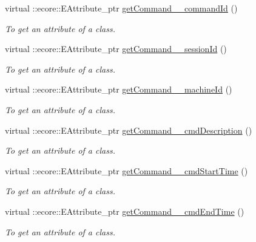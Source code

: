 \begin{DoxyCompactItemize}
virtual ::ecore::EAttribute\_\-ptr \hyperlink{classUMS__Data_1_1UMS__DataPackage_ac206a61c6f0c63a1b8c32607bb4fa14e}{getCommand\_\-\_\-commandId} ()
\begin{DoxyCompactList}\small\item\em To get an attribute of a class. \item\end{DoxyCompactList}\item 
virtual ::ecore::EAttribute\_\-ptr \hyperlink{classUMS__Data_1_1UMS__DataPackage_ae5ba979e040471ef1aff9c3911358c60}{getCommand\_\-\_\-sessionId} ()
\begin{DoxyCompactList}\small\item\em To get an attribute of a class. \item\end{DoxyCompactList}\item 
virtual ::ecore::EAttribute\_\-ptr \hyperlink{classUMS__Data_1_1UMS__DataPackage_a3ecb14d46cfd840793cda9c5424e267c}{getCommand\_\-\_\-machineId} ()
\begin{DoxyCompactList}\small\item\em To get an attribute of a class. \item\end{DoxyCompactList}\item 
virtual ::ecore::EAttribute\_\-ptr \hyperlink{classUMS__Data_1_1UMS__DataPackage_a3868d0e181f7bce49f5043f990577497}{getCommand\_\-\_\-cmdDescription} ()
\begin{DoxyCompactList}\small\item\em To get an attribute of a class. \item\end{DoxyCompactList}\item 
virtual ::ecore::EAttribute\_\-ptr \hyperlink{classUMS__Data_1_1UMS__DataPackage_ab853d11c5603446c6157686f65c0c5c5}{getCommand\_\-\_\-cmdStartTime} ()
\begin{DoxyCompactList}\small\item\em To get an attribute of a class. \item\end{DoxyCompactList}\item 
virtual ::ecore::EAttribute\_\-ptr \hyperlink{classUMS__Data_1_1UMS__DataPackage_a1bb5c8a49c8756015d78cd45fa859eb3}{getCommand\_\-\_\-cmdEndTime} ()
\begin{DoxyCompactList}\small\item\em To get an attribute of a class. \item\end{DoxyCompactList}\item 

\end{DoxyCompactItemize}

